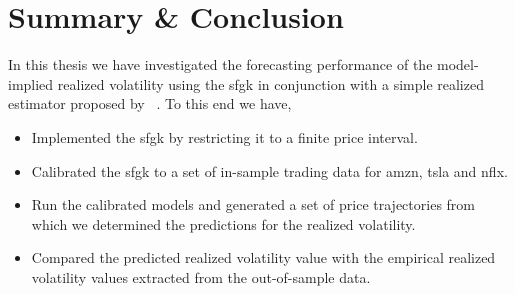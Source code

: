 \documentclass[11pt, a4paper]{thesis}  %
\begin{document}
\chapter{Summary \& Conclusion}
\label{chapter:summary_conclusions}

In this thesis we have investigated the forecasting performance of the model-implied realized volatility using the \ac{sfgk} in conjunction with a simple realized estimator proposed by \citeauthor{Anderson:2000:GreatRealisations}~\cite{Anderson:2000:GreatRealisations}. To this end we have,  

\begin{itemize}

	\item Implemented the \ac{sfgk} by restricting it to a finite price interval.
		
	\item Calibrated the \ac{sfgk} to a set of in-sample trading data for \ac{amzn}, \ac{tsla} and \ac{nflx}.
	
	\item Run the calibrated models and generated a set of price trajectories from which we determined the predictions for the realized volatility. 
	
	\item Compared the predicted realized volatility value with the empirical realized volatility values extracted from the out-of-sample data.
\end{itemize} 

\end{document}

